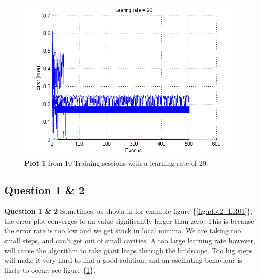 \documentclass[a4paper]{article}
\begin{document}
\begin{figure}[h!] %
	\caption{\label{fig:plot2_LR20}\textbf{Plot 1} from 10 Training sessions with a learning rate of 20.}
	\includegraphics[]{plot2_LR20.png}
\end{figure}
\subsection*{Question 1 \& 2}
\textbf{Question 1 \& 2} Sometimes, as shown in for example figure \{\ref{fig:plot2_LR01}\}, 
the error plot converges to an value significantly larger than zero.
This is because the error rate is too low and we get stuck in local minima. We are 
taking too small steps, and can't get out of small cavities. A too large learning 
rate however, will cause the algorithm to take giant leaps through the landscape. 
Too big steps will make it very hard to find a good solution, and an oscillating 
behaviour is likely to occur; see figure \{\ref{fig:plot2_LR20}\}. 
\end{document}
